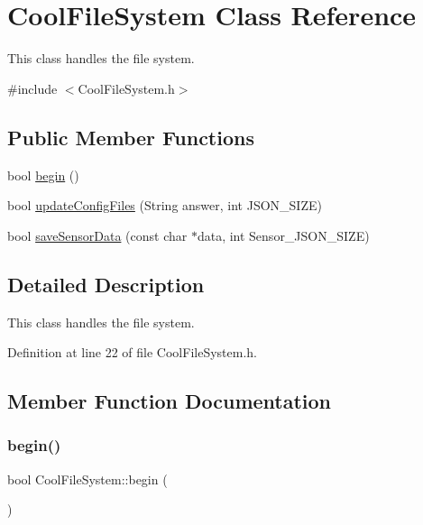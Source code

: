 \hypertarget{class_cool_file_system}{}\section{Cool\+File\+System Class Reference}
\label{class_cool_file_system}


This class handles the file system.  




{\ttfamily \#include $<$Cool\+File\+System.\+h$>$}

\subsection*{Public Member Functions}
\begin{DoxyCompactItemize}
\item 
bool \hyperlink{class_cool_file_system_a6ba6f666ed4c530174f8569d2c636748}{begin} ()
\item 
bool \hyperlink{class_cool_file_system_a32dad79ae80182a83e2e8f52286b7c7b}{update\+Config\+Files} (String answer, int J\+S\+O\+N\+\_\+\+S\+I\+ZE)
\item 
bool \hyperlink{class_cool_file_system_a4c560c2ddd40b74b7758e6ceb2c58957}{save\+Sensor\+Data} (const char $\ast$data, int Sensor\+\_\+\+J\+S\+O\+N\+\_\+\+S\+I\+ZE)
\end{DoxyCompactItemize}


\subsection{Detailed Description}
This class handles the file system. 

Definition at line 22 of file Cool\+File\+System.\+h.



\subsection{Member Function Documentation}
\mbox{\label{class_cool_file_system_a6ba6f666ed4c530174f8569d2c636748}} 
\subsubsection{\texorpdfstring{begin()}{begin()}}
{\footnotesize\ttfamily bool Cool\+File\+System\+::begin (\begin{DoxyParamCaption}{ }\end{DoxyParamCaption})}

